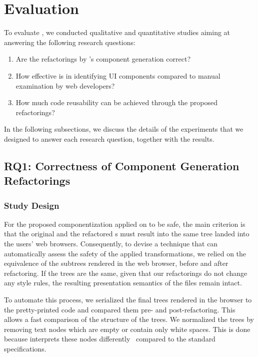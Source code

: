 
\section{Evaluation}
\label{section:evaluation}

To evaluate \toolname, we conducted 
qualitative and quantitative studies 
aiming at answering the following research questions:

\begin{enumerate}[label=\textbf{RQ\arabic*},leftmargin=*]

	\item Are the refactorings by \toolname's component generation correct?

	\item How effective is \toolname 
	in identifying UI components compared to manual examination by web developers?
	
	\item How much code reusability can be achieved through the proposed refactorings? 
	
\end{enumerate}

In the following subsections, we discuss the details of the experiments
that we designed to answer each research question,
together with the results.

\subsection{RQ1: Correctness of Component Generation Refactorings}

\subsubsection{Study Design}

For the proposed componentization applied on \html to be safe, 
the main criterion is that the original and the refactored {\html}s 
must result into the same \dom tree landed into the users' web browsers.
Consequently, to devise a technique that can automatically assess 
the safety of the applied transformations,
we relied on the equivalence of the \dom subtrees 
rendered in the web browser,
before and after refactoring.
If the \dom trees are the same, given that our refactorings do not change
any \css style rules, the resulting presentation semantics of the \html files remain intact. 

To automate this process, we serialized the final \dom trees rendered in the browser
to the pretty-printed \html code and compared them pre- and post-refactoring.
This allows a fast comparison of the structure of the \dom trees.
We normalized the \dom trees by removing text nodes which are empty or contain only white spaces.
This is done because \react interprets these nodes differently~\cite{React:WhitespaceIssue, React:JSXWhiteSpaces} compared to the standard \html specifications.

